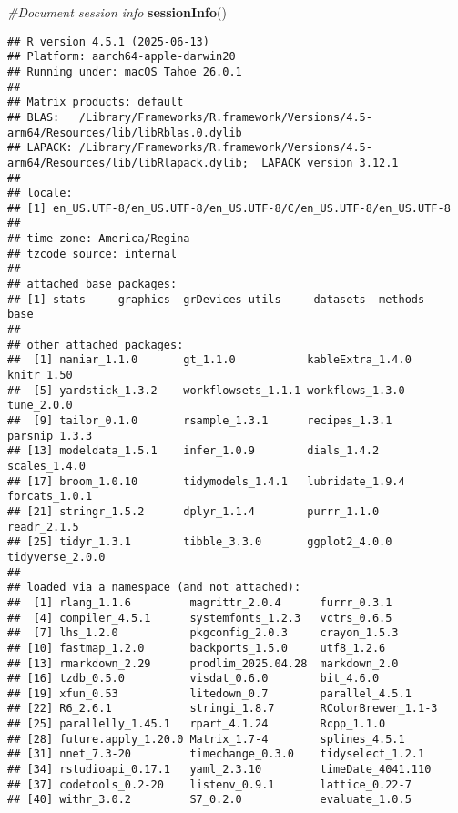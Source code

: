 \documentclass[
]{article}
\newenvironment{Shaded}{\begin{snugshade}}{\end{snugshade}}
\newcommand{\CommentTok}[1]{\textcolor[rgb]{0.56,0.35,0.01}{\textit{#1}}}
\newcommand{\FunctionTok}[1]{\textcolor[rgb]{0.13,0.29,0.53}{\textbf{#1}}}
\newcommand{\NormalTok}[1]{#1}
\begin{document}
\begin{Shaded}
\begin{Highlighting}[]
\CommentTok{\#Document session info}
\FunctionTok{sessionInfo}\NormalTok{()}
\end{Highlighting}
\end{Shaded}

\begin{verbatim}
## R version 4.5.1 (2025-06-13)
## Platform: aarch64-apple-darwin20
## Running under: macOS Tahoe 26.0.1
## 
## Matrix products: default
## BLAS:   /Library/Frameworks/R.framework/Versions/4.5-arm64/Resources/lib/libRblas.0.dylib 
## LAPACK: /Library/Frameworks/R.framework/Versions/4.5-arm64/Resources/lib/libRlapack.dylib;  LAPACK version 3.12.1
## 
## locale:
## [1] en_US.UTF-8/en_US.UTF-8/en_US.UTF-8/C/en_US.UTF-8/en_US.UTF-8
## 
## time zone: America/Regina
## tzcode source: internal
## 
## attached base packages:
## [1] stats     graphics  grDevices utils     datasets  methods   base     
## 
## other attached packages:
##  [1] naniar_1.1.0       gt_1.1.0           kableExtra_1.4.0   knitr_1.50        
##  [5] yardstick_1.3.2    workflowsets_1.1.1 workflows_1.3.0    tune_2.0.0        
##  [9] tailor_0.1.0       rsample_1.3.1      recipes_1.3.1      parsnip_1.3.3     
## [13] modeldata_1.5.1    infer_1.0.9        dials_1.4.2        scales_1.4.0      
## [17] broom_1.0.10       tidymodels_1.4.1   lubridate_1.9.4    forcats_1.0.1     
## [21] stringr_1.5.2      dplyr_1.1.4        purrr_1.1.0        readr_2.1.5       
## [25] tidyr_1.3.1        tibble_3.3.0       ggplot2_4.0.0      tidyverse_2.0.0   
## 
## loaded via a namespace (and not attached):
##  [1] rlang_1.1.6         magrittr_2.0.4      furrr_0.3.1        
##  [4] compiler_4.5.1      systemfonts_1.2.3   vctrs_0.6.5        
##  [7] lhs_1.2.0           pkgconfig_2.0.3     crayon_1.5.3       
## [10] fastmap_1.2.0       backports_1.5.0     utf8_1.2.6         
## [13] rmarkdown_2.29      prodlim_2025.04.28  markdown_2.0       
## [16] tzdb_0.5.0          visdat_0.6.0        bit_4.6.0          
## [19] xfun_0.53           litedown_0.7        parallel_4.5.1     
## [22] R6_2.6.1            stringi_1.8.7       RColorBrewer_1.1-3 
## [25] parallelly_1.45.1   rpart_4.1.24        Rcpp_1.1.0         
## [28] future.apply_1.20.0 Matrix_1.7-4        splines_4.5.1      
## [31] nnet_7.3-20         timechange_0.3.0    tidyselect_1.2.1   
## [34] rstudioapi_0.17.1   yaml_2.3.10         timeDate_4041.110  
## [37] codetools_0.2-20    listenv_0.9.1       lattice_0.22-7     
## [40] withr_3.0.2         S7_0.2.0            evaluate_1.0.5     

\end{verbatim}
\end{document}
